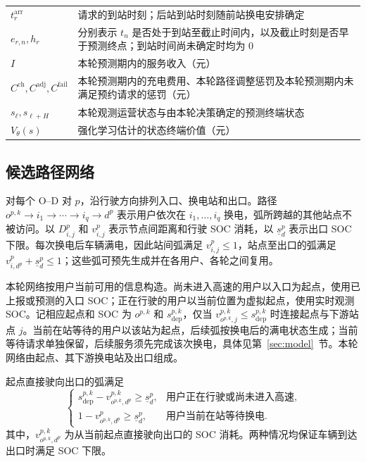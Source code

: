 \begin{longtable}{@{}p{4.4cm}p{11.1cm}@{}}
$t_r^{\mathrm{arr}}$ & 请求的到站时刻；后站到站时刻随前站换电安排确定 \\
$e_{r,n},h_r$ & 分别表示 $t_n$ 是否处于到站至截止时间内，以及截止时刻是否早于预测终点；到站时间尚未确定时均为 $0$ \\
$I$ & 本轮预测期内的服务收入（元） \\
$C^{\mathrm{ch}},C^{\mathrm{adj}},C^{\mathrm{fail}}$ & 本轮预测期内的充电费用、本轮路径调整惩罚及本轮预测期内未满足预约请求的惩罚（元） \\
$s_\ell,s_{\ell+H}$ & 本轮观测运营状态与由本轮决策确定的预测终端状态 \\
$V_\theta(s)$ & 强化学习估计的状态终端价值（元） \\
\end{longtable}

\subsection{候选路径网络}
\label{sec:network}
对每个 O--D 对 $p$，沿行驶方向排列入口、换电站和出口。路径
$o^{p,k}\to i_1\to\cdots\to i_q\to d^p$
表示用户依次在 $i_1,\ldots,i_q$ 换电，弧所跨越的其他站点不被访问。以 $D_{i,j}^p$ 和 $v_{i,j}^p$ 表示节点间距离和行驶 SOC 消耗，以 $\underline s_d^p$ 表示出口 SOC 下限。每次换电后车辆满电，因此站间弧满足 $v_{i,j}^p\le1$，站点至出口的弧满足 $v_{i,d^p}^p+\underline s_d^p\le1$；这些弧可预先生成并在各用户、各轮之间复用。

本轮网络按用户当前可用的信息构造。尚未进入高速的用户以入口为起点，使用已上报或预测的入口 SOC；正在行驶的用户以当前位置为虚拟起点，使用实时观测 SOC。记相应起点和 SOC 为 $o^{p,k}$ 和 $s_{\mathrm{dep}}^{p,k}$，仅当 $v_{o^{p,k},j}^{p,k}\le s_{\mathrm{dep}}^{p,k}$ 时连接起点与下游站点 $j$。当前在站等待的用户以该站为起点，后续弧按换电后的满电状态生成；当前等待请求单独保留，后续服务须先完成该次换电，具体见第~\ref{sec:model}~节。本轮网络由起点、其下游换电站及出口组成。

起点直接驶向出口的弧满足
\begin{equation}
\begin{cases}
s_{\mathrm{dep}}^{p,k}-v_{o^{p,k},d^p}^{p,k}\ge\underline s_d^p,
&\text{用户正在行驶或尚未进入高速},\\
1-v_{o^{p,k},d^p}^{p}\ge\underline s_d^p,
&\text{用户当前在站等待换电}.
\end{cases}
\label{eq:direct_exit_soc}
\end{equation}
其中，$v_{o^{p,k},d^p}^{p,k}$ 为从当前起点直接驶向出口的 SOC 消耗。两种情况均保证车辆到达出口时满足 SOC 下限。

